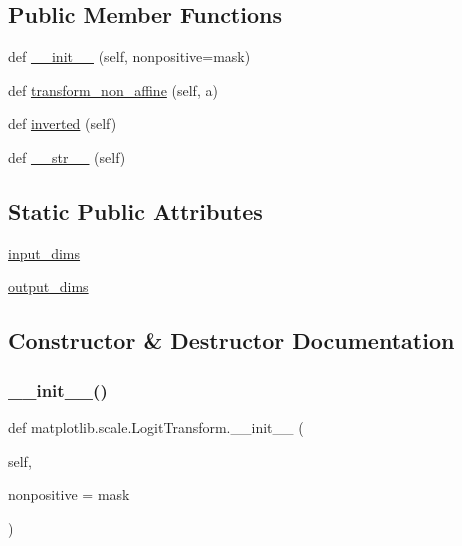 \subsection*{Public Member Functions}
\begin{DoxyCompactItemize}
\item 
def \hyperlink{classmatplotlib_1_1scale_1_1LogitTransform_af87d70094188ea2df2ffd382a22c5a67}{\+\_\+\+\_\+init\+\_\+\+\_\+} (self, nonpositive=\textquotesingle{}mask\textquotesingle{})
\item 
def \hyperlink{classmatplotlib_1_1scale_1_1LogitTransform_a4c3eea814531d376b260a3f0acbd71e6}{transform\+\_\+non\+\_\+affine} (self, a)
\item 
def \hyperlink{classmatplotlib_1_1scale_1_1LogitTransform_a369ee141480f95763fca55f21570a8e7}{inverted} (self)
\item 
def \hyperlink{classmatplotlib_1_1scale_1_1LogitTransform_a2541aad5dee20523317c788976add663}{\+\_\+\+\_\+str\+\_\+\+\_\+} (self)
\end{DoxyCompactItemize}
\subsection*{Static Public Attributes}
\begin{DoxyCompactItemize}
\item 
\hyperlink{classmatplotlib_1_1scale_1_1LogitTransform_a26ed953c70a6069ba92d1e6a8338a286}{input\+\_\+dims}
\item 
\hyperlink{classmatplotlib_1_1scale_1_1LogitTransform_acfa590216baad79afa2772441a100c55}{output\+\_\+dims}
\end{DoxyCompactItemize}


\subsection{Constructor \& Destructor Documentation}
\mbox{\label{classmatplotlib_1_1scale_1_1LogitTransform_af87d70094188ea2df2ffd382a22c5a67}} 
\subsubsection{\texorpdfstring{\+\_\+\+\_\+init\+\_\+\+\_\+()}{\_\_init\_\_()}}
{\footnotesize\ttfamily def matplotlib.\+scale.\+Logit\+Transform.\+\_\+\+\_\+init\+\_\+\+\_\+ (\begin{DoxyParamCaption}\item[{}]{self,  }\item[{}]{nonpositive = {\ttfamily \textquotesingle{}mask\textquotesingle{}} }\end{DoxyParamCaption})}



